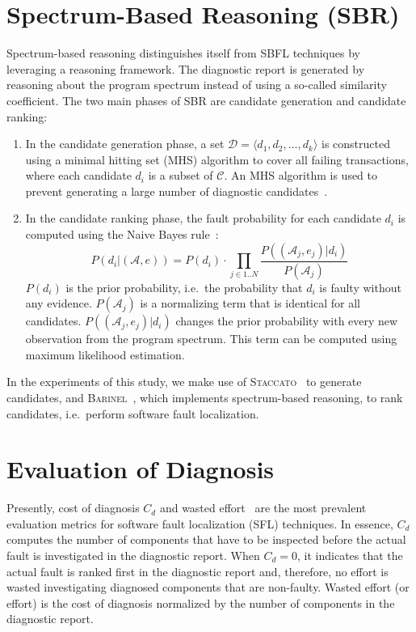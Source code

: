\documentclass[twoside,a4paper,11pt]{memoir}
\begin{document}
\section{Spectrum-Based Reasoning (SBR)}
Spectrum-based reasoning distinguishes itself from SBFL techniques by leveraging a reasoning framework.
The diagnostic report is generated by reasoning about the program spectrum instead of using a so-called similarity coefficient.
The two main phases of SBR are candidate generation and candidate ranking:
\begin{enumerate}
  \item In the candidate generation phase, a set \(\mathcal{D} = \langle d_1, d_2, \dots, d_k \rangle \) is constructed using a minimal hitting set (MHS) algorithm to cover all failing transactions, where each candidate \(d_i \) is a subset of \(\mathcal{C} \).
  An MHS algorithm is used to prevent generating a large number of diagnostic candidates~\cite{Abreu:2009:SMF:1747491.1747511}.

  \item In the candidate ranking phase, the fault probability for each candidate \(d_i \) is computed using the Naive Bayes rule~\cite{Abreu:2009:SMF:1747491.1747511}:
  \begin{equation}
    P(d_i | (\mathcal{A}, e)) = P(d_i) \cdot \prod_{j \in 1..N} \frac{P((\mathcal{A}_j, e_j) | d_i)}{P(\mathcal{A}_j)}
  \end{equation}
  \(P(d_i) \) is the prior probability, i.e.\ the probability that \(d_i \) is faulty without any evidence.
  \(P(\mathcal{A}_j) \) is a normalizing term that is identical for all candidates.
  \(P((\mathcal{A}_j, e_j) | d_i) \) changes the prior probability with every new observation from the program spectrum.
  This term can be computed using maximum likelihood estimation.
\end{enumerate}

In the experiments of this study, we make use of \textsc{Staccato}~\cite{conf/sara/AbreuG09} to generate candidates, and \textsc{Barinel}~\cite{Abreu:2009:SMF:1747491.1747511}, which implements spectrum-based reasoning, to rank candidates, i.e.\ perform software fault localization.

\section{Evaluation of Diagnosis}
Presently, cost of diagnosis \(C_d \) and wasted effort~\cite{Abreu:2009:SMF:1747491.1747511, 7390282, 6693085, Steimann:2013:TVV:2483760.2483767, DBLP:conf/icse/PerezAD17} are the most prevalent evaluation metrics for software fault localization (SFL) techniques.
In essence, \(C_d \) computes the number of components that have to be inspected before the actual fault is investigated in the diagnostic report.
When \(C_d = 0 \), it indicates that the actual fault is ranked first in the diagnostic report and, therefore, no effort is wasted investigating diagnosed components that are non-faulty.
Wasted effort (or effort) is the cost of diagnosis normalized by the number of components in the diagnostic report.
\end{document}
